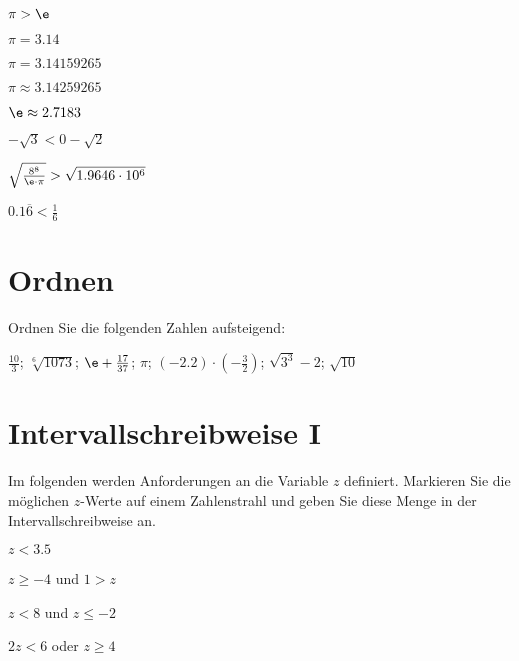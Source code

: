 \begin{bbwAufgabenBlock}

\item
$\pi > \e$ 

\item
$\pi = 3.14$ 

\item
$\pi = 3.14159265$ 

\item
$\pi \approx 3.14259265$ 

\item
$\e \approx 2.7183$ 

\item
$-\sqrt{3} < 0 - \sqrt{2}$ 

\item
$\sqrt{\frac{8^8}{\e\cdot{}\pi}} > \sqrt{1.9646 \cdot{} 10^6}$ 

\item
$0.1\overline{6} < \frac16$ 

\end{bbwAufgabenBlock}

\platzFuerBerechnungenBisEndeSeite{}
\TRAINER{\newpage}




\section{Ordnen}
Ordnen Sie die folgenden Zahlen aufsteigend:

$\frac{10}3$; $\sqrt[6]{1073}$; $\e + \frac{17}{37}$; $\pi$;
$(-2.2)\cdot{}(-\frac32)$; $\sqrt{3^3}-2$; $\sqrt{10}$ 

\platzFuerBerechnungenBisEndeSeite{}


\section{Intervallschreibweise I}
Im folgenden werden Anforderungen an die Variable $z$ definiert.
Markieren Sie die möglichen $z$-Werte auf einem Zahlenstrahl und geben
Sie diese Menge in der Intervallschreibweise an.


\begin{bbwAufgabenBlock}
\item $z<3.5$ \LoesungsRaumLang{$]-\infty; 3.5[$}

\item $z\ge -4$ und $1>z$ \LoesungsRaumLang{$[-4;1[$}

\item $z<8$ und $z\le -2$ \LoesungsRaumLang{$]-\infty;-2]$}

\item $2z<6$ oder $z\ge 4$ \LoesungsRaumLang{$]-\infty;3[ \cup  [4;\infty[$}

\end{bbwAufgabenBlock}


